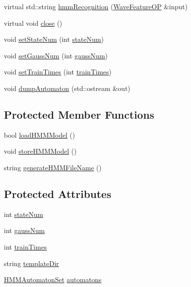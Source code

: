 \begin{DoxyCompactItemize}
\item 
virtual std\+::string \hyperlink{class_h_m_m_recognition_a5f583004dd3281ab1375539258d4c6f7}{hmm\+Recognition} (\hyperlink{class_wave_feature_o_p}{Wave\+Feature\+O\+P} \&input)
\item 
virtual void \hyperlink{class_h_m_m_recognition_ae373459e832f7d1bf13730ee255dbd92}{close} ()
\item 
void \hyperlink{class_h_m_m_recognition_a77996d0232da91730e848775b2d99f3e}{set\+State\+Num} (int \hyperlink{class_h_m_m_recognition_ac9be31139899e7e69694de527d229fd8}{state\+Num})
\item 
void \hyperlink{class_h_m_m_recognition_acdf125127b3d655b56ce222407bb3fed}{set\+Gauss\+Num} (int \hyperlink{class_h_m_m_recognition_af01765163d9d0092534231a20183b0e2}{gauss\+Num})
\item 
void \hyperlink{class_h_m_m_recognition_a71575bab89514444b3d280182aacf6f9}{set\+Train\+Times} (int \hyperlink{class_h_m_m_recognition_ad7bbe647d17214ad2b0de893bc03a8d5}{train\+Times})
\item 
void \hyperlink{class_h_m_m_recognition_a8c0bb4205e8b3fde6c905fb17019263f}{dump\+Automaton} (std\+::ostream \&out)
\end{DoxyCompactItemize}
\subsection*{Protected Member Functions}
\begin{DoxyCompactItemize}
\item 
bool \hyperlink{class_h_m_m_recognition_a7968c6ec0f7af2efa1173aafb72bf1a2}{load\+H\+M\+M\+Model} ()
\item 
void \hyperlink{class_h_m_m_recognition_a6929deeda71a27dc403e421bd530f21b}{store\+H\+M\+M\+Model} ()
\item 
string \hyperlink{class_h_m_m_recognition_a30450b0cb477359a2c6f8e9a85910b40}{generate\+H\+M\+M\+File\+Name} ()
\end{DoxyCompactItemize}
\subsection*{Protected Attributes}
\begin{DoxyCompactItemize}
\item 
int \hyperlink{class_h_m_m_recognition_ac9be31139899e7e69694de527d229fd8}{state\+Num}
\item 
int \hyperlink{class_h_m_m_recognition_af01765163d9d0092534231a20183b0e2}{gauss\+Num}
\item 
int \hyperlink{class_h_m_m_recognition_ad7bbe647d17214ad2b0de893bc03a8d5}{train\+Times}
\item 
string \hyperlink{class_h_m_m_recognition_ae665e0044a1a240b77ff84e877aa3170}{template\+Dir}
\item 
\hyperlink{class_h_m_m_automaton_set}{H\+M\+M\+Automaton\+Set} \hyperlink{class_h_m_m_recognition_a28bd7824ff0afaf5a712f3ef4149f52f}{automatons}
\end{DoxyCompactItemize}
